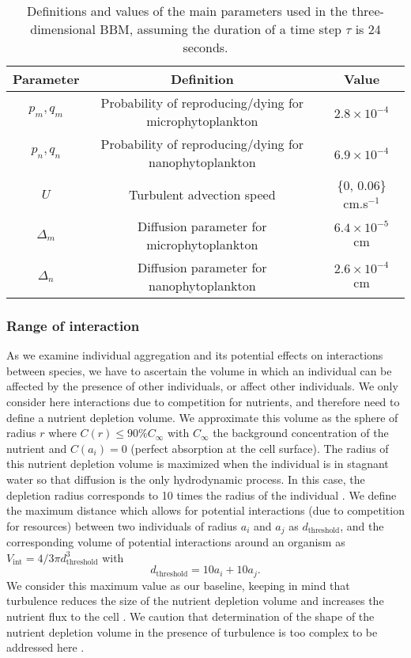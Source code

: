 \documentclass[12pt,english]{article}
\providecommand{\tabularnewline}{\\}
\begin{document}
\begin{table}[H]
\begin{centering}
\begin{tabular}{|c|c|c|}
\hline 
Parameter  & Definition  & Value\tabularnewline
\hline 
$p_{m},q_{m}$  & Probability of reproducing/dying for microphytoplankton & $2.8\times10^{-4}$\tabularnewline
$p_{n},q_{n}$  & Probability of reproducing/dying for nanophytoplankton & $6.9\times10^{-4}$\tabularnewline
$U$  & Turbulent advection speed  & \{0, 0.06\} cm.s$^{-1}$\tabularnewline
$\Delta_{m}$  & Diffusion parameter for microphytoplankton & $6.4\times10^{-5}$ cm\tabularnewline
$\Delta_{n}$  & Diffusion parameter for nanophytoplankton & $2.6\times10^{-4}$ cm\tabularnewline
\hline 
\end{tabular}
\par\end{centering}
\caption{Definitions and values of the main parameters used in the three-dimensional BBM, assuming the duration of a time step $\tau$ is 24 seconds. \label{tab:Definition-and-value}}
\end{table}


\subsubsection*{Range of interaction}

As we examine individual aggregation and its potential effects on
interactions between species, we have to ascertain the volume in which
an individual can be affected by the presence of other individuals,
or affect other individuals. We only consider here interactions due
to competition for nutrients, and therefore need to define a nutrient
depletion volume. We approximate this volume as the sphere of radius
$r$ where $C(r)\leq90\%C_{\infty}$ with $C_{\infty}$ the background
concentration of the nutrient and $C(a_i) = 0$ (perfect absorption at the cell surface). The radius of this nutrient depletion
volume is maximized when the individual is in stagnant water so that
diffusion is the only hydrodynamic process. In this case, the depletion
radius corresponds to 10 times the radius of the individual \citep{jumars_physical_1993,karp-boss_nutrient_1996}.
We define the maximum distance which allows for potential interactions
(due to competition for resources) between two individuals of radius
$a_{i}$ and $a_{j}$ as $d_{\text{threshold}}$, and the corresponding
volume of potential interactions around an organism as $V_{\text{int}}=4/3\pi d_{\text{threshold}}^{3}$
with 
\begin{equation}
d_{\text{threshold}}=10a_{i}+10a_{j}.\label{eq:distance_interaction}
\end{equation}
We consider this maximum value as our baseline, keeping in mind that
turbulence reduces the size of the nutrient depletion volume and increases
the nutrient flux to the cell \citep{arnott_artificially_2021}. We
caution that determination of the shape of the nutrient depletion
volume in the presence of turbulence is too complex to be addressed
here \citep{karp-boss_nutrient_1996}.
\end{document}
